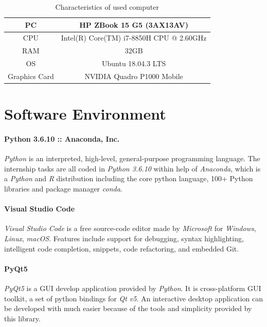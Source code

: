 \documentclass[a4paper, twoside]{report}
\begin{document}
\begin{table}[h]
\centering
\begin{tabular}{|c|c|}
\hline
PC & HP ZBook 15 G5 (3AX13AV) \\
\hline
CPU & Intel(R) Core(TM) i7-8850H CPU @ 2.60GHz \\
\hline
RAM & 32GB \\
\hline
OS & Ubuntu 18.04.3 LTS \\
\hline
Graphics Card & NVIDIA Quadro P1000 Mobile\\
\hline
\end{tabular}
\caption{Characteristics of used computer}
\end{table}


\section{Software Environment}
\paragraph{Python 3.6.10 :: Anaconda, Inc.}
\textit{Python} is an interpreted, high-level, general-purpose programming language. The internship tasks are all coded in \textit{Python 3.6.10} within help of \textit{Anaconda}, which is a \textit{Python} and \textit{R} distribution including the core python language, 100+ Python libraries and package manager \textit{conda}. \\ \par

\paragraph{Visual Studio Code}
\textit{Visual Studio Code} is a free source-code editor  made by \textit{Microsoft} for \textit{Windows}, \textit{Linux}, \textit{macOS}. Features include support for debugging, syntax highlighting, intelligent code completion, snippets, code refactoring, and embedded Git.  \\ \par

\paragraph{PyQt5}
\textit{PyQt5} is a GUI develop application provided by \textit{Python}. It is cross-platform GUI toolkit, a set of python bindings for \textit{Qt v5}. An interactive desktop application can be developed with much easier because of the tools and simplicity provided by this library. \\ \par
\end{document}
